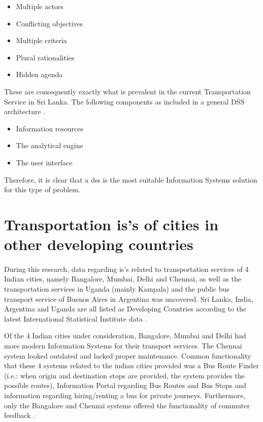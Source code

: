 \begin {itemize}
\item Multiple actors
\item Conflicting objectives
\item Multiple criteria
\item Plural rationalities
\item Hidden agenda
\end {itemize}

These are consequently exactly what is prevalent in the current Transportation Service in Sri Lanka.  The following components as included in a general DSS architecture \cite{Fedra2000}.

\begin {itemize}
\item Information resources
\item The analytical engine
\item The user interface
\end {itemize}

Therefore, it is clear that a \acrshort{dss} is the most suitable Information Systems solution for this type of problem.



\section{Transportation \acrshort{is}'s of cities in other developing countries}

\paragraph{} During this research, data regarding \acrshort{is}'s related to transportation services of 4 Indian cities, namely Bangalore, Mumbai, Delhi and Chennai, as well as the transportation services in Uganda (mainly Kampala) and the public bus transport service of Buenos Aires in Argentina was uncovered. Sri Lanka, India, Argentina and Uganda are all listed as Developing Countries according to the latest International Statistical Institute data \cite{ISI2013}.

Of the 4 Indian cities under consideration, Bangalore, Mumbai and Delhi had more modern Information Systems for their transport services. The Chennai system looked outdated and lacked proper maintenance. Common functionality that these 4 systems related to the indian cities provided was a Bus Route Finder (i.e.: when origin and destination stops are provided, the system provides the possible routes), Information Portal regarding Bus Routes and Bus Stops and information regarding hiring/renting a bus for private journeys. Furthermore, only the Bangalore and Chennai systems offered the functionality of commuter feedback \cite{BMTC1997, BEST1995, DTC2012, MTC2001}.

